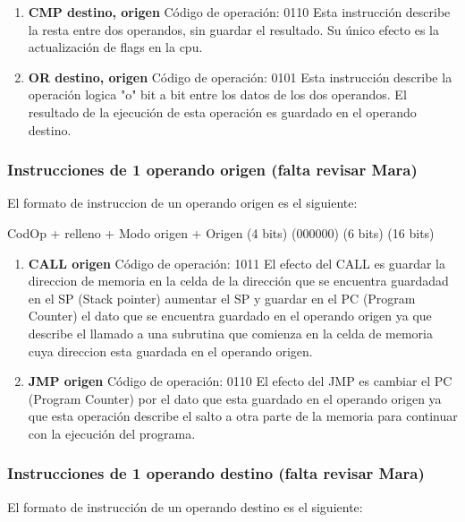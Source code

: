 \begin{enumerate}
\item \textbf{CMP destino, origen}
Código de operación: 0110
Esta instrucción describe la resta entre dos operandos, sin guardar el resultado. Su único efecto es la actualización de flags en la cpu.

\item \textbf{OR destino, origen}
Código de operación: 0101
Esta instrucción describe la operación logica "o" bit a bit entre los datos de los dos operandos. El resultado de la ejecución de esta operación es guardado en el operando destino.
\end{enumerate}

\subsubsection{Instrucciones de 1 operando origen  (falta revisar Mara)}

El formato de instruccion de un operando origen es el siguiente:

  CodOp   +   relleno   +  Modo origen +   Origen
(4 bits)      (000000)        (6 bits)    (16 bits)

\begin{enumerate}
\item \textbf{CALL origen}
Código de operación: 1011
El efecto del CALL es guardar la direccion de memoria en la celda de la dirección que se encuentra guardadad en el SP (Stack pointer) aumentar el SP y guardar en el PC (Program Counter) el dato que se encuentra guardado en el operando origen ya que describe el llamado a una subrutina que comienza en la celda de memoria cuya direccion esta guardada en el operando origen.

\item \textbf{JMP origen}
Código de operación: 0110
El efecto del JMP es cambiar el PC (Program Counter) por el dato que esta guardado en el operando origen ya que esta operación describe el salto a otra parte de la memoria para continuar con la ejecución del programa.
\end{enumerate}

\subsubsection{Instrucciones de 1 operando destino  (falta revisar Mara)}

El formato de instrucción de un operando destino es el siguiente:

